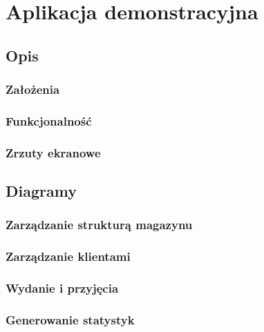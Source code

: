 \chapter{Aplikacja demonstracyjna}
\label{c4:c4}

\section{Opis}
	\subsection{Założenia}
	\subsection{Funkcjonalność}
	\subsection{Zrzuty ekranowe}

\section{Diagramy}
	\subsection{Zarządzanie strukturą magazynu} 	\label{USE_CASE}
	\subsection{Zarządzanie klientami} 				\label{USE_CASE}
	\subsection{Wydanie i przyjęcia}				\label{USE_CASE}
	\subsection{Generowanie statystyk}				\label{USE_CASE}